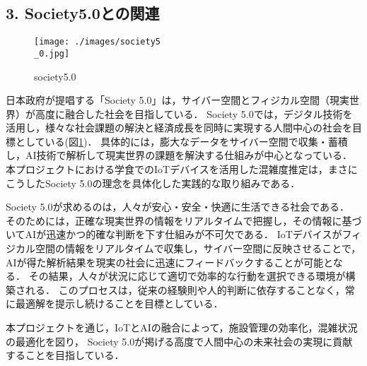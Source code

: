 \subsection*{3. Society5.0との関連}
\begin{figure}[tb]
	\centering
	\texttt{[image: ./images/society5\\\_0.jpg]}
	\caption{society5.0}
	\label{fig:society5.0}
\end{figure}

日本政府が提唱する「Society 5.0」\cite{society5.0}は，サイバー空間とフィジカル空間（現実世界）が高度に融合した社会を目指している．
Society 5.0では，デジタル技術を活用し，様々な社会課題の解決と経済成長を同時に実現する人間中心の社会を目標としている(図\ref{fig:society5.0})．
具体的には，膨大なデータをサイバー空間で収集・蓄積し，AI技術で解析して現実世界の課題を解決する仕組みが中心となっている．
本プロジェクトにおける学食でのIoTデバイスを活用した混雑度推定は，まさにこうしたSociety 5.0の理念を具体化した実践的な取り組みである．

Society 5.0が求めるのは，人々が安心・安全・快適に生活できる社会である．
そのためには，正確な現実世界の情報をリアルタイムで把握し，その情報に基づいてAIが迅速かつ的確な判断を下す仕組みが不可欠である．
IoTデバイスがフィジカル空間の情報をリアルタイムで収集し，サイバー空間に反映させることで，AIが得た解析結果を現実の社会に迅速にフィードバックすることが可能となる．
その結果，人々が状況に応じて適切で効率的な行動を選択できる環境が構築される．
このプロセスは，従来の経験則や人的判断に依存することなく，常に最適解を提示し続けることを目標としている．

本プロジェクトを通じ，IoTとAIの融合によって，施設管理の効率化，混雑状況の最適化を図り，
Society 5.0が掲げる高度で人間中心の未来社会の実現に貢献することを目指している．








%
%
